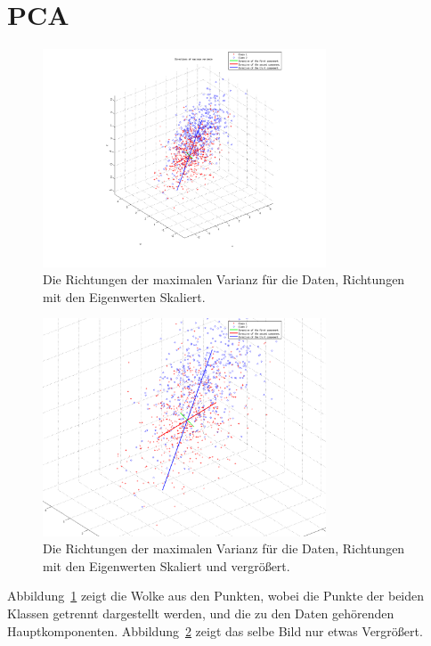 \section{PCA}



\begin{figure}[h!]
  \begin{center}
    \includegraphics[width=0.75\textwidth]{./figures/4_Components}
    \caption{Die Richtungen der maximalen Varianz für die Daten, Richtungen mit den Eigenwerten Skaliert.}
    \label{fig:4_components}
  \end{center}
\end{figure}

\begin{figure}[h!]
  \begin{center}
    \includegraphics[width=0.75\textwidth]{./figures/4_Components_zoom}
    \caption{Die Richtungen der maximalen Varianz für die Daten, Richtungen mit den Eigenwerten Skaliert und vergrößert.}
    \label{fig:4_components_zoom}
  \end{center}
\end{figure}
Abbildung~\ref{fig:4_components} zeigt die Wolke aus den Punkten, wobei die Punkte der beiden Klassen getrennt dargestellt werden, und die zu den Daten gehörenden Hauptkomponenten.
Abbildung~\ref{fig:4_components_zoom} zeigt das selbe Bild nur etwas Vergrößert.\newline
 
